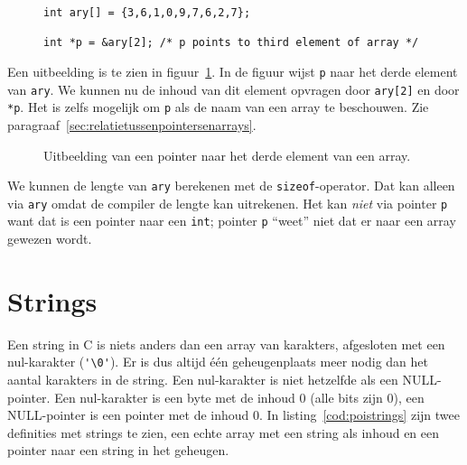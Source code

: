 \begin{figure}[!ht]
\begin{lstlisting}[caption=Een pointer naar het derde element van een array.,label=cod:poithirdarray]
int ary[] = {3,6,1,0,9,7,6,2,7};

int *p = &ary[2]; /* p points to third element of array */
\end{lstlisting}
\end{figure}

Een uitbeelding is te zien in figuur~\ref{fig:poithirdarray}. In de figuur wijst \texttt{p} naar het derde element van \texttt{ary}. We kunnen nu de inhoud van dit element opvragen door \texttt{ary[2]} en door \texttt{*p}. Het is zelfs mogelijk om \texttt{p} als de naam van een array te beschouwen. Zie paragraaf~\ref{sec:relatietussenpointersenarrays}.

\begin{figure}[!ht]
\centering
{}
\caption{Uitbeelding van een pointer naar het derde element van een array.}
\label{fig:poithirdarray}
\end{figure}

We kunnen de lengte van \texttt{ary} berekenen met de \texttt{sizeof}-operator. Dat kan alleen via \texttt{ary} omdat de compiler de lengte kan uitrekenen. Het kan \textsl{niet} via pointer \texttt{p} want dat is een pointer naar een \texttt{int}; pointer \texttt{p} ``weet'' niet dat er naar een array gewezen wordt.


\section{Strings}
\label{sec:strings}
Een string in C is niets anders dan een array van karakters, afgesloten met een nul-karakter (\lstinline|'\0'|). Er is dus altijd één geheugenplaats meer nodig dan het aantal karakters in de string. Een nul-karakter is niet hetzelfde als een NULL-pointer. Een nul-karakter is een byte met de inhoud 0 (alle bits zijn 0), een NULL-pointer is een pointer met de inhoud 0. In listing~\ref{cod:poistrings} zijn twee definities met strings te zien, een echte array met een string als inhoud en een pointer naar een string in het geheugen.


